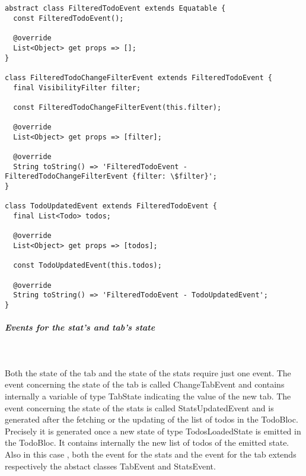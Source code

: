 \begin{code}
\mbox{}\\
 \mbox{}
\label{code:2.14}
\begin{verbatim}

abstract class FilteredTodoEvent extends Equatable {
  const FilteredTodoEvent();

  @override
  List<Object> get props => [];
}

class FilteredTodoChangeFilterEvent extends FilteredTodoEvent {
  final VisibilityFilter filter;

  const FilteredTodoChangeFilterEvent(this.filter);

  @override
  List<Object> get props => [filter];

  @override
  String toString() => 'FilteredTodoEvent - FilteredTodoChangeFilterEvent {filter: \$filter}';
}

class TodoUpdatedEvent extends FilteredTodoEvent {
  final List<Todo> todos;

  @override
  List<Object> get props => [todos];

  const TodoUpdatedEvent(this.todos);

  @override
  String toString() => 'FilteredTodoEvent - TodoUpdatedEvent';
}
\end{verbatim}
\mbox{}
\end{code}


\subparagraph{Events for the stat’s and tab’s state}\mbox{}\\
\label{subpar:todo_app_bloc_core_state}

Both the state of the tab and the state of the stats require just one event. The event concerning the state of the tab is called ChangeTabEvent and contains internally a variable of type TabState indicating the value of the new tab. The event concerning the state of the stats is called StatsUpdatedEvent and is generated after the fetching or the updating of the list of todos in the TodoBloc. Precisely it is generated once a new state of type TodosLoadedState is emitted in the TodoBloc. It contains internally the new list of todos of the emitted state. \\
Also in this case , both the event for the stats and the event for the tab extends respectively the abstact classes TabEvent and StatsEvent.

